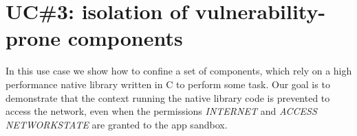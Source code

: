 \section{UC\#3: isolation of vulnerability-prone components}\label{appendix:seapp_uc3}

In this use case we show how to confine a set of components, which
rely on a high performance native library written in C to perform some
task. Our goal is to demonstrate that the context running the native
library code is prevented to access the network, even when the
permissions {\em INTERNET} and {\em ACCESS\textunderscore
  NETWORK\textunderscore STATE} are granted to the app sandbox.

\begin{figure}[h]
  \centering
  \hfill
  \hfill

\end{figure}
